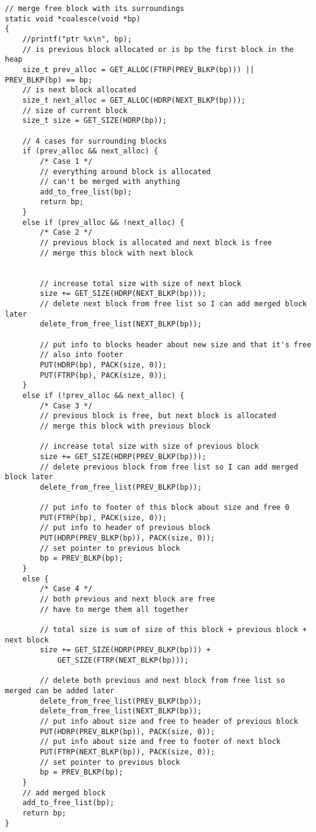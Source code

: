 \documentclass[a4paper]{article}
\begin{document}
\begin{lstlisting}
// merge free block with its surroundings
static void *coalesce(void *bp)
{
	//printf("ptr %x\n", bp);
	// is previous block allocated or is bp the first block in the heap
	size_t prev_alloc = GET_ALLOC(FTRP(PREV_BLKP(bp))) || PREV_BLKP(bp) == bp;
	// is next block allocated
	size_t next_alloc = GET_ALLOC(HDRP(NEXT_BLKP(bp)));
	// size of current block
	size_t size = GET_SIZE(HDRP(bp));

	// 4 cases for surrounding blocks
	if (prev_alloc && next_alloc) {
		/* Case 1 */
		// everything around block is allocated
		// can't be merged with anything
		add_to_free_list(bp);
		return bp;
	}
	else if (prev_alloc && !next_alloc) {
		/* Case 2 */
		// previous block is allocated and next block is free
		// merge this block with next block
		
		
		// increase total size with size of next block
		size += GET_SIZE(HDRP(NEXT_BLKP(bp)));
		// delete next block from free list so I can add merged block later
		delete_from_free_list(NEXT_BLKP(bp));

		// put info to blocks header about new size and that it's free
		// also into footer
		PUT(HDRP(bp), PACK(size, 0));
		PUT(FTRP(bp), PACK(size, 0));
	}
	else if (!prev_alloc && next_alloc) {
		/* Case 3 */
		// previous block is free, but next block is allocated
		// merge this block with previous block
		
		// increase total size with size of previous block
		size += GET_SIZE(HDRP(PREV_BLKP(bp)));
		// delete previous block from free list so I can add merged block later
		delete_from_free_list(PREV_BLKP(bp));

		// put info to footer of this block about size and free 0
		PUT(FTRP(bp), PACK(size, 0));
		// put info to header of previous block
		PUT(HDRP(PREV_BLKP(bp)), PACK(size, 0));
		// set pointer to previous block
		bp = PREV_BLKP(bp);
	}
	else {
		/* Case 4 */
		// both previous and next block are free
		// have to merge them all together
		
		// total size is sum of size of this block + previous block + next block
		size += GET_SIZE(HDRP(PREV_BLKP(bp))) +
			GET_SIZE(FTRP(NEXT_BLKP(bp)));

		// delete both previous and next block from free list so merged can be added later
		delete_from_free_list(PREV_BLKP(bp));
		delete_from_free_list(NEXT_BLKP(bp));
		// put info about size and free to header of previous block
		PUT(HDRP(PREV_BLKP(bp)), PACK(size, 0));
		// put info about size and free to footer of next block
		PUT(FTRP(NEXT_BLKP(bp)), PACK(size, 0));
		// set pointer to previous block
		bp = PREV_BLKP(bp);
	}
	// add merged block
	add_to_free_list(bp);
	return bp;
}


\end{lstlisting}
\end{document}
